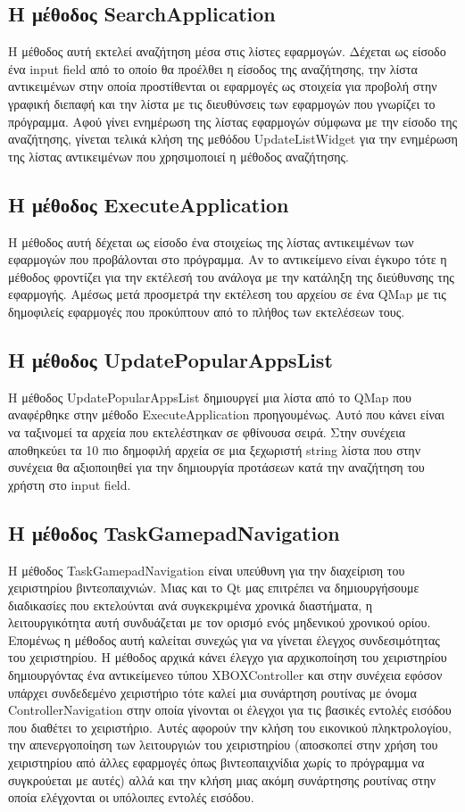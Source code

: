 \subsection{Η μέθοδος SearchApplication}
Η μέθοδος αυτή εκτελεί αναζήτηση μέσα στις λίστες εφαρμογών. Δέχεται ως είσοδο ένα
input field από το οποίο θα προέλθει η είσοδος της αναζήτησης, την λίστα αντικειμένων
στην οποία προστίθενται οι εφαρμογές ως στοιχεία για προβολή στην γραφική διεπαφή και
την λίστα με τις διευθύνσεις των εφαρμογών που γνωρίζει το πρόγραμμα. Αφού γίνει ενημέρωση
της λίστας εφαρμογών σύμφωνα με την είσοδο της αναζήτησης, γίνεται τελικά κλήση της 
μεθόδου UpdateListWidget για την ενημέρωση της λίστας αντικειμένων που χρησιμοποιεί
η μέθοδος αναζήτησης. 


\subsection{Η μέθοδος ExecuteApplication}
Η μέθοδος αυτή δέχεται ως είσοδο ένα στοιχείως της λίστας αντικειμένων των εφαρμογών
που προβάλονται στο πρόγραμμα. Αν το αντικείμενο είναι έγκυρο τότε η μέθοδος φροντίζει
για την εκτέλεσή του ανάλογα με την κατάληξη της διεύθυνσης της εφαρμογής. Αμέσως μετά
προσμετρά την εκτέλεση του αρχείου σε ένα QMap με τις δημοφιλείς εφαρμογές που προκύπτουν
από το πλήθος των εκτελέσεων τους.


\subsection{Η μέθοδος UpdatePopularAppsList}
Η μέθοδος UpdatePopularAppsList δημιουργεί μια λίστα από το QMap που αναφέρθηκε στην
μέθοδο ExecuteApplication προηγουμένως. Αυτό που κάνει είναι να ταξινομεί τα αρχεία που
εκτελέστηκαν σε φθίνουσα σειρά. Στην συνέχεια αποθηκεύει τα 10 πιο δημοφιλή αρχεία σε
μια ξεχωριστή string λίστα που στην συνέχεια θα αξιοποιηθεί για την δημιουργία προτάσεων
κατά την αναζήτηση του χρήστη στο input field.


\subsection{Η μέθοδος TaskGamepadNavigation}
Η μέθοδος TaskGamepadNavigation είναι υπεύθυνη για την διαχείριση του χειριστηρίου βιντεοπαιχνιών. 
Μιας και το Qt μας επιτρέπει να δημιουργήσουμε διαδικασίες που εκτελούνται ανά συγκεκριμένα 
χρονικά διαστήματα, η λειτουργικότητα αυτή συνδυάζεται με τον ορισμό ενός μηδενικού χρονικού 
ορίου. Επομένως η μέθοδος αυτή καλείται συνεχώς για να γίνεται έλεγχος συνδεσιμότητας του
χειριστηρίου. Η μέθοδος αρχικά κάνει έλεγχο για αρχικοποίηση του χειριστηρίου δημιουργόντας ένα 
αντικείμενεο τύπου XBOXController και στην συνέχεια εφόσον υπάρχει συνδεδεμένο χειριστήριο τότε 
καλεί μια συνάρτηση ρουτίνας με όνομα ControllerNavigation στην οποία γίνονται οι έλεγχοι για τις 
βασικές εντολές εισόδου που διαθέτει το χειριστήριο. Αυτές αφορούν την κλήση του εικονικού πληκτρολογίου, 
την απενεργοποίηση των λειτουργιών του χειριστηρίου (αποσκοπεί στην χρήση του χειριστηρίου από άλλες 
εφαρμογές όπως βιντεοπαιχνίδια χωρίς το πρόγραμμα να συγκρούεται με αυτές) αλλά και την κλήση μιας 
ακόμη συνάρτησης ρουτίνας στην οποία ελέγχονται οι υπόλοιπες εντολές εισόδου.




